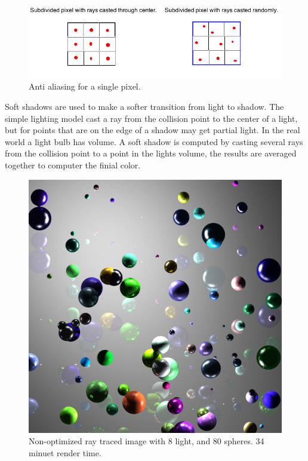 \documentclass[12pt,a4paper,oneside]{article}
\begin{document}
\begin{figure}[H]
\includegraphics[scale=0.6]{aa.png} 
\caption{Anti aliasing for a single pixel.}
\label{aa}
\end{figure}

Soft shadows are used to make a softer transition from light to shadow.     The simple lighting model cast a ray from the collision point to the center of a light, but for points that are on the edge of a shadow may get partial light.  In the real world a light bulb has volume.  A soft shadow is computed by casting several rays from the collision point to a point in the lights volume, the results are averaged together to computer the finial color.


\begin{figure}[H]
\begin{center}
\includegraphics[scale=0.35]{result1.png} 
\caption{Non-optimized ray traced image with 8 light, and 80 spheres.  34 minuet render time.}
\label{result1}
\end{center}
\end{figure}


\newpage
\listofalgorithms
\listoffigures
\listoftables


\end{document}

